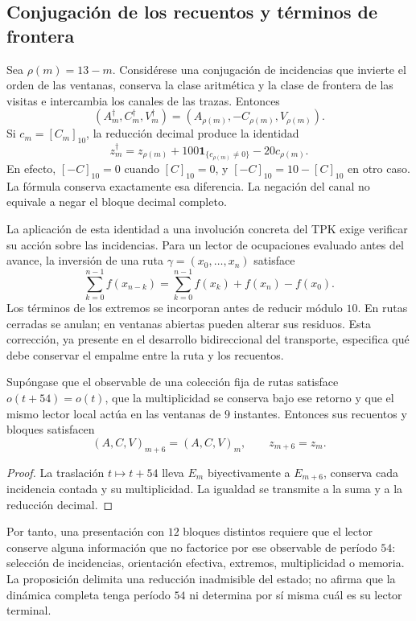 \subsection{Conjugación de los recuentos y términos de frontera}
\label{subsec:registro-conjugacion-incidencial}

Sea \(\rho(m)=13-m\). Considérese una conjugación de incidencias
que invierte el orden de las ventanas, conserva la clase aritmética y la
clase de frontera de las visitas e intercambia los canales de las trazas.
Entonces
\[
 (A_m^\dagger,C_m^\dagger,V_m^\dagger)
 =(A_{\rho(m)},-C_{\rho(m)},V_{\rho(m)}).
\]
Si \(c_m=[C_m]_{10}\), la reducción decimal produce la identidad
\begin{equation}
 z_m^\dagger=z_{\rho(m)}
       +100\mathbf1_{\{c_{\rho(m)}\ne0\}}-20c_{\rho(m)}.
 \label{eq:registro-conjugacion-decimal}
\end{equation}
En efecto, \([-C]_{10}=0\) cuando \([C]_{10}=0\), y
\([-C]_{10}=10-[C]_{10}\) en otro caso. La fórmula conserva
exactamente esa diferencia. La negación del canal no equivale a negar
el bloque decimal completo.

La aplicación de esta identidad a una involución concreta del TPK exige
verificar su acción sobre las incidencias. Para un lector de ocupaciones
evaluado antes del avance, la inversión de una ruta
\(\gamma=(x_0,\ldots,x_n)\) satisface
\[
 \sum_{k=0}^{n-1}f(x_{n-k})
 =\sum_{k=0}^{n-1}f(x_k)+f(x_n)-f(x_0).
\]
Los términos de los extremos se incorporan antes de reducir módulo
\(10\). En rutas cerradas se anulan; en ventanas abiertas pueden
alterar sus residuos. Esta corrección, ya presente en el desarrollo
bidireccional del transporte, especifica qué debe conservar el empalme
entre la ruta y los recuentos.

\begin{proposition}
Supóngase que el observable de una colección fija de rutas satisface
\(o(t+54)=o(t)\), que la multiplicidad se conserva bajo ese retorno
y que el mismo lector local actúa en las ventanas de \(9\) instantes.
Entonces sus recuentos y bloques satisfacen
\[
 (A,C,V)_{m+6}=(A,C,V)_m,\qquad z_{m+6}=z_m.
\]
\end{proposition}

\begin{proof}
La traslación \(t\mapsto t+54\) lleva \(E_m\) biyectivamente
a \(E_{m+6}\), conserva cada incidencia contada y su multiplicidad.
La igualdad se transmite a la suma y a la reducción decimal.
\end{proof}

Por tanto, una presentación con \(12\) bloques distintos requiere que
el lector conserve alguna información que no factorice por ese observable
de período \(54\): selección de incidencias, orientación efectiva,
extremos, multiplicidad o memoria. La proposición delimita una reducción
inadmisible del estado; no afirma que la dinámica completa tenga
período \(54\) ni determina por sí misma cuál es su lector terminal.

